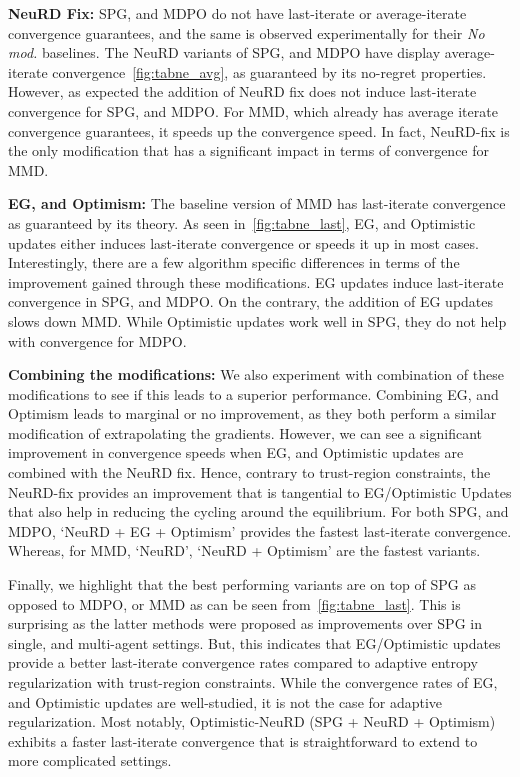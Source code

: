 \textbf{NeuRD Fix:}
SPG, and MDPO do not have last-iterate or average-iterate convergence guarantees, and the same is
observed experimentally for their \textit{No mod.
} baselines.
The NeuRD variants of SPG, and MDPO have display average-iterate convergence~\ref{fig:tabne_avg},
as guaranteed by its no-regret properties.
However, as expected the addition of NeuRD fix does not induce last-iterate convergence for SPG,
and MDPO.
For MMD, which already has average iterate convergence guarantees, it speeds up the convergence
speed.
In fact, NeuRD-fix is the only modification that has a significant impact in terms of convergence
for MMD.

\textbf{EG, and Optimism:}
The baseline version of MMD has last-iterate convergence as guaranteed by its theory.
As seen in~\ref{fig:tabne_last}, EG, and Optimistic updates either induces last-iterate convergence
or speeds it up in most cases.
Interestingly, there are a few algorithm specific differences in terms of the improvement gained
through these modifications.
EG updates induce last-iterate convergence in SPG, and MDPO.
On the contrary, the addition of EG updates slows down MMD.
While Optimistic updates work well in SPG, they do not help with convergence for MDPO.

\textbf{Combining the modifications:}
We also experiment with combination of these modifications to see if this leads to a superior
performance.
Combining EG, and Optimism leads to marginal or no improvement, as they both perform a similar
modification of extrapolating the gradients.
However, we can see a significant improvement in convergence speeds when EG, and Optimistic updates
are combined with the NeuRD fix.
Hence, contrary to trust-region constraints, the NeuRD-fix provides an improvement that is
tangential to EG/Optimistic Updates that also help in reducing the cycling around the equilibrium.
For both SPG, and MDPO, `NeuRD + EG + Optimism' provides the fastest last-iterate convergence.
Whereas, for MMD, `NeuRD', `NeuRD + Optimism' are the fastest variants.

Finally, we highlight that the best performing variants are on top of SPG as opposed to MDPO, or
MMD as can be seen from~\ref{fig:tabne_last}.
This is surprising as the latter methods were proposed as improvements over SPG in single, and
multi-agent settings.
But, this indicates that EG/Optimistic updates provide a better last-iterate convergence rates
compared to adaptive entropy regularization with trust-region constraints.
While the convergence rates of EG, and Optimistic updates are well-studied, it is not the case for
adaptive regularization.
Most notably, Optimistic-NeuRD (SPG + NeuRD + Optimism) exhibits a faster last-iterate convergence
that is straightforward to extend to more complicated settings.

